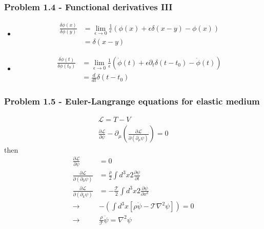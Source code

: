 \documentclass[10pt,a4paper]{book}
\theoremstyle{definition}
\begin{document}
\subsubsection{Problem 1.4 - Functional derivatives III}
\begin{itemize}
\item
\begin{align}
\frac{\delta\phi(x)}{\delta\phi(y)}
&=\lim_{\epsilon\rightarrow0}\frac{1}{\epsilon}\left(\phi(x)+\epsilon\delta(x-y)-\phi(x)\right)\\
&=\delta(x-y)
\end{align}
\item
\begin{align}
\frac{\delta\dot\phi(t)}{\delta\phi(t_0)}
&=\lim_{\epsilon\rightarrow0}\frac{1}{\epsilon}\left(\dot\phi(t)+\epsilon\partial_t\delta(t-t_0)-\dot\phi(t)\right)\\
&=\frac{d}{dt}\delta(t-t_0)
\end{align}
\end{itemize}

\subsubsection{Problem 1.5 - Euler-Langrange equations for elastic medium}
\begin{align}
\mathcal{L}=T-V\\
\frac{\partial\mathcal{L}}{\partial\psi}-\partial_\mu\left(\frac{\partial\mathcal{L}}{\partial(\partial_\mu\psi)}\right)=0
\end{align}
then
\begin{align}
\frac{\partial\mathcal{L}}{\partial\psi}&=0\\
\frac{\partial\mathcal{L}}{\partial(\partial_0\psi)}&=\frac{\rho}{2}\int d^3x 2\frac{\partial\psi}{\partial t}\\
\frac{\partial\mathcal{L}}{\partial(\partial_k\psi)}&=-\frac{\mathcal{T}}{2}\int d^3x 2\frac{\partial\psi}{\partial x^k}\\
\rightarrow&-\left(\int d^3x[\rho\ddot\psi-\mathcal{T}\nabla^2\psi]\right)=0\\
\rightarrow&\frac{\rho}{\mathcal{T}}\ddot\psi=\nabla^2\psi
\end{align}
\end{document}
